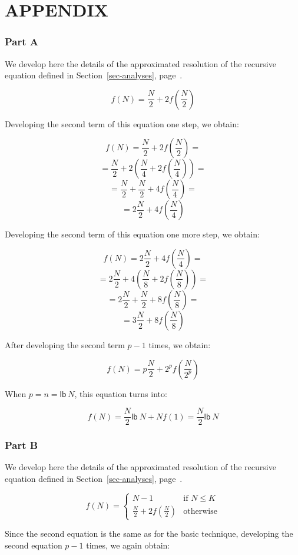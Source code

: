 
\vspace{1em}
\section*{APPENDIX}
\subsubsection*{Part A}
We develop here the details of the approximated resolution
of the recursive equation defined in Section~\ref{sec-analyses},
page~\pageref{analyse1}.

\[ f(N) = \frac{N}{2} + 2f(\frac{N}{2}) \]

Developing the second term of this equation one step, we obtain:

\[ f(N) = \frac{N}{2} + 2f(\frac{N}{2}) = \]
\[ = \frac{N}{2} + 2(\frac{N}{4} + 2f(\frac{N}{4})) =\]
\[ = \frac{N}{2} + \frac{N}{2} + 4f(\frac{N}{4}) =\]
\[ = 2\frac{N}{2} + 4f(\frac{N}{4})\]

Developing the second term of this equation one more step, we obtain:

\[ f(N) = 2\frac{N}{2} + 4f(\frac{N}{4}) = \]
\[ = 2\frac{N}{2} + 4(\frac{N}{8} + 2f(\frac{N}{8})) =\]
\[ = 2\frac{N}{2} + \frac{N}{2} + 8f(\frac{N}{8}) =\]
\[ = 3\frac{N}{2} + 8f(\frac{N}{8}) \]

After developing the second term $p-1$ times, we obtain:

\[ f(N) = p\frac{N}{2} + 2^pf(\frac{N}{2^p})\]

When $p = n = \mathsf{lb}~N$, this equation turns into:

\[ f(N) = \frac{N}{2}\mathsf{lb}~N + Nf(1) = \frac{N}{2}\mathsf{lb}~N\]

\subsubsection*{Part B}
We develop here the details of the approximated resolution
of the recursive equation defined in Section~\ref{sec-analyses},
page~\pageref{analyse2}.

\[ f(N) = \left\{ \begin{array}{ll}
    N-1 & \mbox{if $N \le K$} \\
    \frac{N}{2} + 2f(\frac{N}{2}) &\mbox{otherwise}
  \end{array} \right. \]

Since the second equation is the same as for the basic technique,
developing the second equation $p-1$ times, we again obtain:

